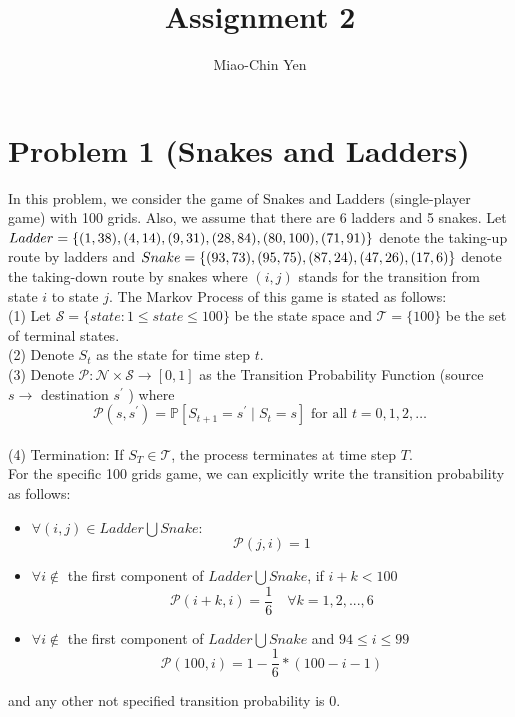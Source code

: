 \documentclass{article}
\title{Assignment 2}
\author{Miao-Chin Yen}
\begin{document}
\maketitle


\section*{Problem 1 (Snakes and Ladders)}
\hspace{1em}In this problem, we consider the game of Snakes and Ladders (single-player game) with 100 grids. Also, we assume that there are 6 ladders and 5 snakes. Let $Ladder=\{(1,38), (4,14), (9,31), (28,84),\\ (80, 100), (71, 91)\}$ denote the taking-up route by ladders and $Snake=\{(93,73), (95,75), (87,24), (47,26),\\ (17, 6)\}$ denote the taking-down route by snakes where $(i,j)$ stands for the transition from state $i$ to state $j$. The Markov Process of this game is stated as follows:\\
\hspace*{1em}(1) Let $\mathcal{S}=\{state: 1\leq state \leq 100 \}$ be the state space and $\mathcal{T}=\{100\}$ be the set of terminal states.\\
\hspace*{1em}(2) Denote $S_{t}$ as the state for time step $t$.\\
\hspace*{1em}(3) Denote $\mathcal{P}: \mathcal{N} \times \mathcal{S} \rightarrow[0,1]$ as the Transition Probability Function (source $s \rightarrow$ destination $s^{\prime}$ ) where
$$
\mathcal{P}\left(s, s^{\prime}\right)=\mathbb{P}\left[S_{t+1}=s^{\prime} \mid S_{t}=s\right] \text { for all } t=0,1,2, \ldots
$$\\
\hspace*{1em}(4) Termination: If $S_{T} \in \mathcal{T}$, the process terminates at time step $T$.\\
For the specific 100 grids game, we can explicitly write the transition probability as follows:\\ 
\begin{itemize}
\item $\forall(i,j)\in Ladder\bigcup Snake$:
$$
\mathcal{P}\left(j, i\right) = 1
$$
\item $\forall i \not\in $ the first component of $Ladder\bigcup Snake$, if $i+k<100$
$$
\mathcal{P}\left(i+k, i\right) = \frac{1}{6}\hspace{1em} \forall k = 1, 2, ..., 6
$$
\item $\forall i \not\in $ the first component of $Ladder\bigcup Snake$ and $94\leq i\leq 99$ 
$$
\mathcal{P}\left(100, i\right) = 1-\frac{1}{6}* (100 -i -1)$$
\end{itemize}
and any other not specified transition probability  is 0.
\end{document}
